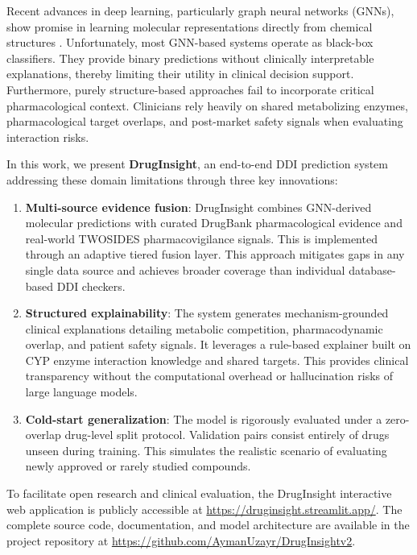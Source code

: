 \documentclass[conference]{IEEEtran}
\begin{document}
Recent advances in deep learning, particularly graph neural networks (GNNs), show promise in learning molecular representations directly from chemical structures \cite{deepddi2018, kgnn2020}. Unfortunately, most GNN-based systems operate as black-box classifiers. They provide binary predictions without clinically interpretable explanations, thereby limiting their utility in clinical decision support. Furthermore, purely structure-based approaches fail to incorporate critical pharmacological context. Clinicians rely heavily on shared metabolizing enzymes, pharmacological target overlaps, and post-market safety signals when evaluating interaction risks.

In this work, we present \textbf{DrugInsight}, an end-to-end DDI prediction system addressing these domain limitations through three key innovations:

\begin{enumerate}
    \item \textbf{Multi-source evidence fusion}: DrugInsight combines GNN-derived molecular predictions with curated DrugBank pharmacological evidence and real-world TWOSIDES \cite{tatonetti2012} pharmacovigilance signals. This is implemented through an adaptive tiered fusion layer. This approach mitigates gaps in any single data source and achieves broader coverage than individual database-based DDI checkers.

    \item \textbf{Structured explainability}: The system generates mechanism-grounded clinical explanations detailing metabolic competition, pharmacodynamic overlap, and patient safety signals. It leverages a rule-based explainer built on CYP enzyme interaction knowledge and shared targets. This provides clinical transparency without the computational overhead or hallucination risks of large language models.

    \item \textbf{Cold-start generalization}: The model is rigorously evaluated under a zero-overlap drug-level split protocol. Validation pairs consist entirely of drugs unseen during training. This simulates the realistic scenario of evaluating newly approved or rarely studied compounds.
\end{enumerate}

To facilitate open research and clinical evaluation, the DrugInsight interactive web application is publicly accessible at \url{https://druginsight.streamlit.app/}. The complete source code, documentation, and model architecture are available in the project repository at \url{https://github.com/AymanUzayr/DrugInsightv2}.
\end{document}

